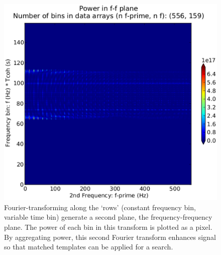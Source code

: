 \begin{figure}
\begin{center}
\includegraphics[width=0.8\paperwidth,height=0.4\paperheight]{ffplane-4e21-on-4e24.eps}
\caption{Fourier-transforming along the `rows' (constant frequency bin, variable time bin) generate a second plane, the frequency-frequency plane. The power of each bin in this transform is plotted as a pixel. By aggregating power, this second Fourier transform enhances signal so that matched templates can be applied for a search.}
\end{center}
\end{figure}

